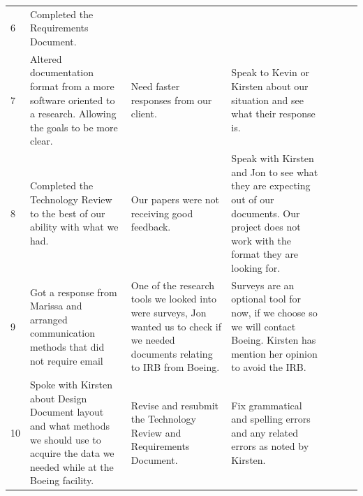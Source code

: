 \documentclass[onecolumn, draftclsnofoot,10pt, compsoc]{IEEEtran}
\begin{document}
\begin{table}[]
\begin{tabular}{|l|p{0.3\linewidth}|p{0.3\linewidth}|p{0.3\linewidth}|p{0.3\linewidth}}
6    & Completed the Requirements Document.                                                                                                                                  &                                                                                                                                   &                                                                                                                                                 &  \\ \cline{1-4}
7    & Altered documentation format from a more software oriented to a research. Allowing the goals to be more clear.                                                        & Need faster responses from our client.                                                                                            & Speak to Kevin or Kirsten about our situation and see what their response is.                                                                   &  \\ \cline{1-4}
8    & Completed the Technology Review to the best of our ability with what we had.                                                                                          & Our papers were not receiving good feedback.                                                                                      & Speak with Kirsten and Jon to see what they are expecting out of our documents. Our project does not work with the format they are looking for. &  \\ \cline{1-4}
9    & Got a response from Marissa and arranged communication methods that did not require email                                                                             & One of the research tools we looked into were surveys, Jon wanted us to check if we needed documents relating to IRB from Boeing. & Surveys are an optional tool for now, if we choose so we will contact Boeing. Kirsten has mention her opinion to avoid the IRB.                 &  \\ \cline{1-4}
10   & Spoke with Kirsten about Design Document layout and what methods we should use to acquire the data we needed while at the Boeing facility.                            & Revise and resubmit the Technology Review and Requirements Document.                                                              & Fix grammatical and spelling errors and any related errors as noted by Kirsten.                                                                 &  \\ \cline{1-4}
\end{tabular}
\end{table}



\end{document}
